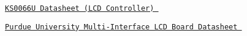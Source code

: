\href{LCD_KS0066U_CONTROLLER_DATASHEET.pdf}{\tt K\-S0066\-U Datasheet (L\-C\-D Controller) } \par
 \href{LCD_BOARD_DATASHEET.pdf}{\tt Purdue University Multi-\/\-Interface L\-C\-D Board Datasheet } 